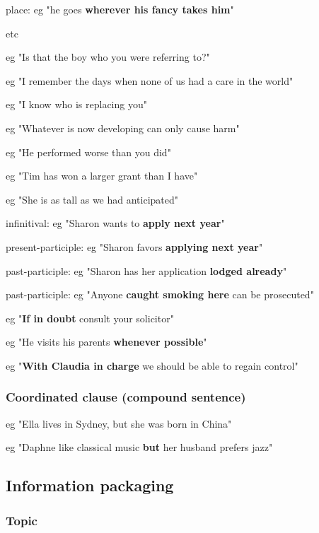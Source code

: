 place:  eg "he goes \textbf{wherever his fancy takes him}"

etc


eg "Is that the boy who you were referring to?"

eg "I remember the days when none of us had a care in the world"

eg "I know who is replacing you"

eg "Whatever is now developing can only cause harm"


eg "He performed worse than you did"

eg "Tim has won a larger grant than I have"

eg "She is as tall as we had anticipated"


infinitival: eg "Sharon wants to \textbf{apply next year}"

present-participle: eg "Sharon favors \textbf{applying next year}"

past-participle: eg "Sharon has her application \textbf{lodged already}"

past-participle: eg "Anyone \textbf{caught smoking here} can be prosecuted"


eg "\textbf{If in doubt} consult your solicitor"

eg "He visits his parents \textbf{whenever possible}"

eg "\textbf{With Claudia in charge} we should be able to regain control"

\subsubsection{Coordinated clause (compound sentence)}

eg "Ella lives in Sydney, but she was born in China"

eg "Daphne like classical music \textbf{but} her husband prefers jazz"

\subsection{Information packaging}

\subsubsection{Topic}

